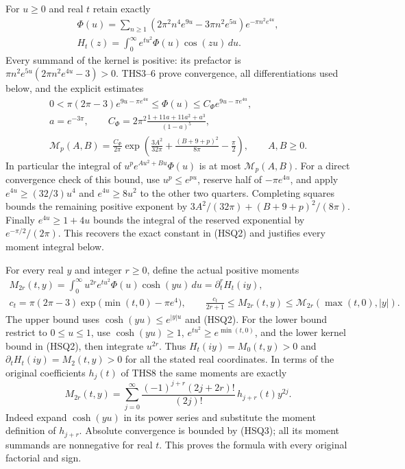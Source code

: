 For $u\ge0$ and real $t$ retain exactly
\begin{equation}\tag{HSQ1}
 \begin{gathered}
 \Phi(u)=\sum_{n\ge1}
       (2\pi^2n^4e^{9u}-3\pi n^2e^{5u})e^{-\pi n^2e^{4u}},\\
 H_t(z)=\int_0^\infty e^{tu^2}\Phi(u)\cos(zu)\,du.
 \end{gathered}
\end{equation}
Every summand of the kernel is positive: its prefactor is
$\pi n^2e^{5u}(2\pi n^2e^{4u}-3)>0$. THS3--6 prove convergence,
all differentiations used below, and the explicit estimates
\begin{equation}\tag{HSQ2}
 \begin{gathered}
 0<\pi(2\pi-3)e^{9u-\pi e^{4u}}
       \le\Phi(u)\le C_\Phi e^{9u-\pi e^{4u}},\\
 a=e^{-3\pi},\qquad
 C_\Phi=2\pi^2\frac{1+11a+11a^2+a^3}{(1-a)^5},\\
 \mathcal M_p(A,B)=\frac{C_\Phi}{2\pi}
  \exp\left(\frac{3A^2}{32\pi}
      +\frac{(B+9+p)^2}{8\pi}-\frac\pi2\right),\qquad A,B\ge0.
 \end{gathered}
\end{equation}
In particular the integral of $u^pe^{Au^2+Bu}\Phi(u)$ is at
most $\mathcal M_p(A,B)$. For a direct convergence check of this
bound, use $u^p\le e^{pu}$, reserve half of
$-\pi e^{4u}$, and apply $e^{4u}\ge(32/3)u^4$ and
$e^{4u}\ge8u^2$ to the other two quarters. Completing squares
bounds the remaining positive exponent by
$3A^2/(32\pi)+(B+9+p)^2/(8\pi)$. Finally
$e^{4u}\ge1+4u$ bounds the integral of the reserved exponential
by $e^{-\pi/2}/(2\pi)$. This recovers the exact constant in
(HSQ2) and justifies every moment integral below.

For every real $y$ and integer $r\ge0$, define the actual positive
moments
\begin{equation}\tag{HSQ3}
 \begin{gathered}
 M_{2r}(t,y)=\int_0^\infty u^{2r}e^{tu^2}\Phi(u)\cosh(yu)\,du
              =\partial_t^rH_t(iy),\\
 c_t=\pi(2\pi-3)\exp\bigl(\min(t,0)-\pi e^4\bigr),\qquad
 \frac{c_t}{2r+1}\le M_{2r}(t,y)
        \le\mathcal M_{2r}(\max(t,0),|y|).
 \end{gathered}
\end{equation}
The upper bound uses $\cosh(yu)\le e^{|y|u}$ and (HSQ2).
For the lower bound restrict to $0\le u\le1$, use
$\cosh(yu)\ge1$, $e^{tu^2}\ge e^{\min(t,0)}$, and the lower
kernel bound in (HSQ2), then integrate $u^{2r}$. Thus
$H_t(iy)=M_0(t,y)>0$ and $\partial_tH_t(iy)=M_2(t,y)>0$
for all the stated real coordinates.
In terms of the original coefficients $h_j(t)$ of THS8 the same
moments are exactly
\begin{equation}\tag{HSQ4}
 M_{2r}(t,y)=\sum_{j=0}^{\infty}
   \frac{(-1)^{j+r}(2j+2r)!}{(2j)!}\,h_{j+r}(t)y^{2j}.
\end{equation}
Indeed expand $\cosh(yu)$ in its power series and substitute the
moment definition of $h_{j+r}$. Absolute convergence is bounded
by (HSQ3); all its moment summands are nonnegative for real $t$.
This proves the formula with every original factorial and sign.

